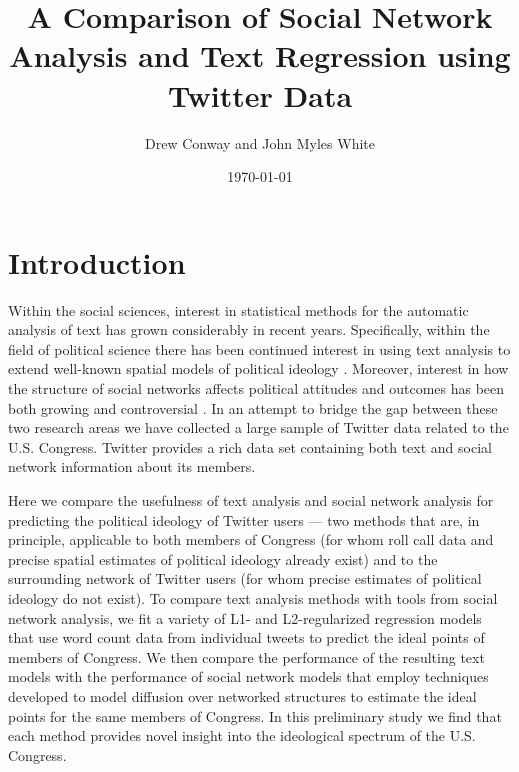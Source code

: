 \documentclass[10pt]{article}
\title{A Comparison of Social Network Analysis and Text Regression using Twitter Data}
\author{Drew Conway and John Myles White}
\date{\today}
\begin{document}
\maketitle

\section{Introduction}
Within the social sciences, interest in statistical methods for the automatic analysis of text has grown considerably in recent years.  Specifically, within the field of political science there has been continued interest in using text analysis to extend well-known spatial models of political ideology \citep{Grimmer_2011, Monroe_2008, Laver_2003}.  Moreover, interest in how the structure of social networks affects political attitudes and outcomes has been both growing \citep{Siegel_2009, Burton_2009} and controversial \citep{Fowler_2010, Lyons_2010}.  In an attempt to bridge the gap between these two research areas we have collected a large sample of Twitter data related to the U.S. Congress. Twitter provides a rich data set containing both text and social network information about its members. 

Here we compare the usefulness of text analysis and social network analysis for predicting the political ideology of Twitter users --- two methods that are, in principle, applicable to both members of Congress (for whom roll call data and precise spatial estimates of political ideology already exist) and to the surrounding network of Twitter users (for whom precise estimates of political ideology do not exist). To compare text analysis methods with tools from social network analysis, we fit a variety of L1- and L2-regularized regression models that use word count data from individual tweets to predict the ideal points of members of Congress. We then compare the performance of the resulting text models with the performance of social network models that employ techniques developed to model diffusion over networked structures to estimate the ideal points for the same members of Congress. In this preliminary study we find that each method provides novel insight into the ideological spectrum of the U.S. Congress.
\end{document}
